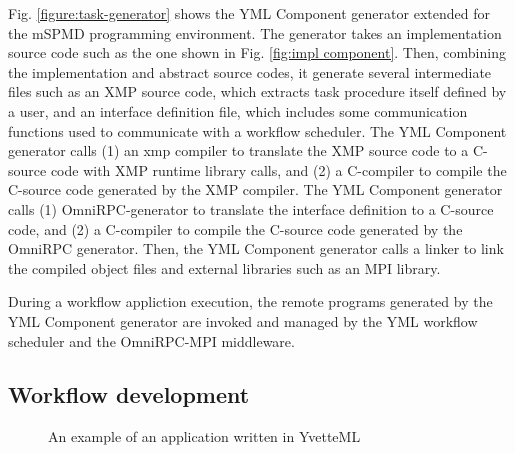 \documentclass[graybox]{svmult}
\begin{document}
Fig. \ref{figure:task-generator} shows the YML Component generator extended for the mSPMD programming environment. The generator takes an implementation source code such as the one shown in Fig. \ref{fig:impl component}. Then, combining the implementation and abstract source codes, it generate several intermediate files such as an XMP source code, which extracts task procedure itself defined by a user, and an interface definition file, which includes some communication functions used to communicate with a workflow scheduler. 
The YML Component generator calls (1) an xmp compiler to translate the XMP source code to a C-source code with XMP runtime library calls, and (2) a C-compiler to compile the C-source code generated by the XMP compiler. 
The YML Component generator calls (1) OmniRPC-generator to translate the interface definition to a C-source code, and (2) a C-compiler to compile the C-source code generated by the OmniRPC generator. Then, the YML Component generator calls a linker to link the compiled object files and external libraries such as an MPI library. 

During a workflow appliction execution, the remote programs generated by the YML Component generator are invoked and managed by the YML workflow scheduler and the OmniRPC-MPI middleware. 

\subsection{Workflow development}
\label{subsection:workflow-yvettml}

\begin{figure}[t]
 \begin{center}
  \caption{An example of an application written in YvetteML}
  \label{figure:app-yvetteml}
 \end{center}
\end{figure}
\end{document}
